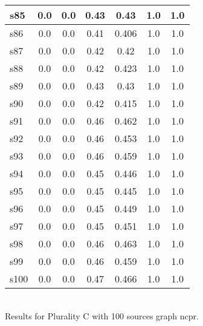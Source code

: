 \documentclass{article}
\begin{document}
\begin{tabular}{|l|c|c|c|c|c|c|}
\hline
s85 &0.0 & 0.0 & 0.43 & 0.43 & 1.0 & 1.0\\
\hline
s86 &0.0 & 0.0 & 0.41 & 0.406 & 1.0 & 1.0\\
\hline
s87 &0.0 & 0.0 & 0.42 & 0.42 & 1.0 & 1.0\\
\hline
s88 &0.0 & 0.0 & 0.42 & 0.423 & 1.0 & 1.0\\
\hline
s89 &0.0 & 0.0 & 0.43 & 0.43 & 1.0 & 1.0\\
\hline
s90 &0.0 & 0.0 & 0.42 & 0.415 & 1.0 & 1.0\\
\hline
s91 &0.0 & 0.0 & 0.46 & 0.462 & 1.0 & 1.0\\
\hline
s92 &0.0 & 0.0 & 0.46 & 0.453 & 1.0 & 1.0\\
\hline
s93 &0.0 & 0.0 & 0.46 & 0.459 & 1.0 & 1.0\\
\hline
s94 &0.0 & 0.0 & 0.45 & 0.446 & 1.0 & 1.0\\
\hline
s95 &0.0 & 0.0 & 0.45 & 0.445 & 1.0 & 1.0\\
\hline
s96 &0.0 & 0.0 & 0.45 & 0.449 & 1.0 & 1.0\\
\hline
s97 &0.0 & 0.0 & 0.45 & 0.451 & 1.0 & 1.0\\
\hline
s98 &0.0 & 0.0 & 0.46 & 0.463 & 1.0 & 1.0\\
\hline
s99 &0.0 & 0.0 & 0.46 & 0.459 & 1.0 & 1.0\\
\hline
s100 &0.0 & 0.0 & 0.47 & 0.466 & 1.0 & 1.0\\
\hline
\end{tabular}\\

\noindent Results for Plurality C with 100 sources graph ncpr.
\end{document}
